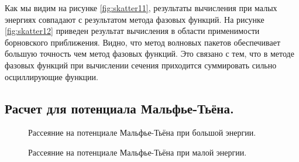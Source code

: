 \documentclass[a4paper,12pt]{article}
\begin{document}
	Как мы видим на рисунке \ref{fig:skatter11}, результаты вычисления при малых энергиях совпадают с результатом метода фазовых функций. На рисунке \ref{fig:skatter12} приведен результат вычисления в области применимости борновского приближения. Видно, что метод волновых пакетов обеспечивает большую точность чем метод фазовых функций. Это связано с тем, что в методе фазовых функций при вычислении сечения приходится суммировать сильно осциллирующие функции.

\linebreak
\subsection{Расчет для потенциала Мальфье-Тьёна.}
\begin{figure}[h!]
\caption{Рассеяние на потенциале Мальфье-Тьёна при большой энергии.}
\label{fig:skatter21}
\end{figure}

\begin{figure}[h!]
\caption{Рассеяние на потенциале Мальфье-Тьёна при малой энергии.}
\label{fig:skatter22}
\end{figure}
\end{document}
